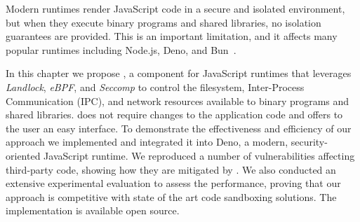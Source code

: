 Modern runtimes render JavaScript code in a secure and isolated
environment, but when they execute binary programs and shared
libraries, no isolation guarantees are provided. This is an important
limitation, and it affects many popular runtimes including Node.js,
Deno, and Bun~\cite{node-permissions,deno-permissions}.

In this chapter we propose \natisand, a component for JavaScript runtimes
that leverages {\em Landlock}, {\em eBPF}, and {\em Seccomp} to
control the filesystem, Inter-Process Communication (IPC), and network
resources available to binary programs and shared libraries.  \natisand
does not require changes to the application code and offers to the
user an easy interface.
%
To demonstrate the effectiveness and efficiency of our approach we
implemented \natisand and integrated it into Deno, a modern,
security-oriented JavaScript runtime. We reproduced a number of
vulnerabilities affecting third-party code, showing how they are
mitigated by \natisand. We also conducted an extensive experimental
evaluation to assess the performance, proving that our approach is
competitive with state of the art code sandboxing solutions. The
implementation is available open source.

